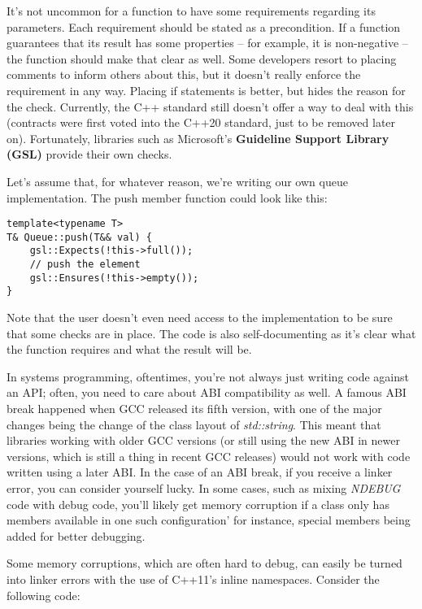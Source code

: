 It's not uncommon for a function to have some requirements regarding its parameters. Each requirement should be stated as a precondition. If a function guarantees that its result has some properties – for example, it is non-negative – the function should make that clear as well. Some developers resort to placing comments to inform others about this, but it doesn't really enforce the requirement in any way. Placing if statements is better, but hides the reason for the check. Currently, the C++ standard still doesn't offer a way to deal with this (contracts were first voted into the C++20 standard, just to be removed later on). Fortunately, libraries such as Microsoft's \textbf{Guideline Support Library (GSL)} provide their own checks.

Let's assume that, for whatever reason, we're writing our own queue implementation. The push member function could look like this:

\begin{lstlisting}[style=styleCXX]
template<typename T>
T& Queue::push(T&& val) {
	gsl::Expects(!this->full());
	// push the element
	gsl::Ensures(!this->empty());
}
\end{lstlisting}

Note that the user doesn't even need access to the implementation to be sure that some checks are in place. The code is also self-documenting as it's clear what the function requires and what the result will be.


In systems programming, oftentimes, you're not always just writing code against an API; often, you need to care about ABI compatibility as well. A famous ABI break happened when GCC released its fifth version, with one of the major changes being the change of the class layout of \textit{std::string}. This meant that libraries working with older GCC versions (or still using the new ABI in newer versions, which is still a thing in recent GCC releases) would not work with code written using a later ABI. In the case of an ABI break, if you receive a linker error, you can consider yourself lucky. In some cases, such as mixing \textit{NDEBUG} code with debug code, you'll likely get memory corruption if a class only has members available in one such configuration' for instance, special members being added for better debugging.

Some memory corruptions, which are often hard to debug, can easily be turned into linker errors with the use of C++11's inline namespaces. Consider the following code:

